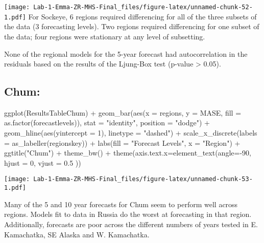 \documentclass[
]{article}
\newenvironment{Shaded}{\begin{snugshade}}{\end{snugshade}}
\newcommand{\AttributeTok}[1]{\textcolor[rgb]{0.77,0.63,0.00}{#1}}
\newcommand{\DecValTok}[1]{\textcolor[rgb]{0.00,0.00,0.81}{#1}}
\newcommand{\FloatTok}[1]{\textcolor[rgb]{0.00,0.00,0.81}{#1}}
\newcommand{\FunctionTok}[1]{\textcolor[rgb]{0.00,0.00,0.00}{#1}}
\newcommand{\NormalTok}[1]{#1}
\newcommand{\SpecialCharTok}[1]{\textcolor[rgb]{0.00,0.00,0.00}{#1}}
\newcommand{\StringTok}[1]{\textcolor[rgb]{0.31,0.60,0.02}{#1}}
\begin{document}
\texttt{[image: Lab-1-Emma-ZR-MHS-Final\_files/figure-latex/unnamed-chunk-52-1.pdf]}
For Sockeye, 6 regions required differencing for all of the three
subsets of the data (3 forecasting levels). Two regions required
differencing for one subset of the data; four regions were stationary at
any level of subsetting.

None of the regional models for the 5-year forecast had autocorrelation
in the residuals based on the results of the Ljung-Box test (p-value
\textgreater{} 0.05).

\hypertarget{chum}{%
\subsection{Chum:}\label{chum}}

\begin{Shaded}
\begin{Highlighting}[]
\FunctionTok{ggplot}\NormalTok{(ResultsTableChum) }\SpecialCharTok{+} 
  \FunctionTok{geom\_bar}\NormalTok{(}\FunctionTok{aes}\NormalTok{(}\AttributeTok{x =}\NormalTok{ regions, }\AttributeTok{y =}\NormalTok{ MASE, }\AttributeTok{fill =} \FunctionTok{as.factor}\NormalTok{(forecastlevels)), }\AttributeTok{stat =} \StringTok{"identity"}\NormalTok{, }\AttributeTok{position =} \StringTok{"dodge"}\NormalTok{) }\SpecialCharTok{+} 
  \FunctionTok{geom\_hline}\NormalTok{(}\FunctionTok{aes}\NormalTok{(}\AttributeTok{yintercept =} \DecValTok{1}\NormalTok{), }\AttributeTok{linetype =} \StringTok{"dashed"}\NormalTok{) }\SpecialCharTok{+} 
  \FunctionTok{scale\_x\_discrete}\NormalTok{(}\AttributeTok{labels =} \FunctionTok{as\_labeller}\NormalTok{(regionskey)) }\SpecialCharTok{+}
  \FunctionTok{labs}\NormalTok{(}\AttributeTok{fill =} \StringTok{"Forecast Levels"}\NormalTok{, }\AttributeTok{x =} \StringTok{"Region"}\NormalTok{) }\SpecialCharTok{+} 
  \FunctionTok{ggtitle}\NormalTok{(}\StringTok{"Chum"}\NormalTok{) }\SpecialCharTok{+} \FunctionTok{theme\_bw}\NormalTok{() }\SpecialCharTok{+} \FunctionTok{theme}\NormalTok{(}\AttributeTok{axis.text.x=}\FunctionTok{element\_text}\NormalTok{(}\AttributeTok{angle=}\SpecialCharTok{{-}}\DecValTok{90}\NormalTok{, }\AttributeTok{hjust =} \DecValTok{0}\NormalTok{, }\AttributeTok{vjust =} \FloatTok{0.5}\NormalTok{ ))}
\end{Highlighting}
\end{Shaded}

\texttt{[image: Lab-1-Emma-ZR-MHS-Final\_files/figure-latex/unnamed-chunk-53-1.pdf]}

Many of the 5 and 10 year forecasts for Chum seem to perform well across
regions. Models fit to data in Russia do the worst at forecasting in
that region. Additionally, forecasts are poor across the different
numbers of years tested in E. Kamachatka, SE Alaska and W. Kamachatka.
\end{document}
